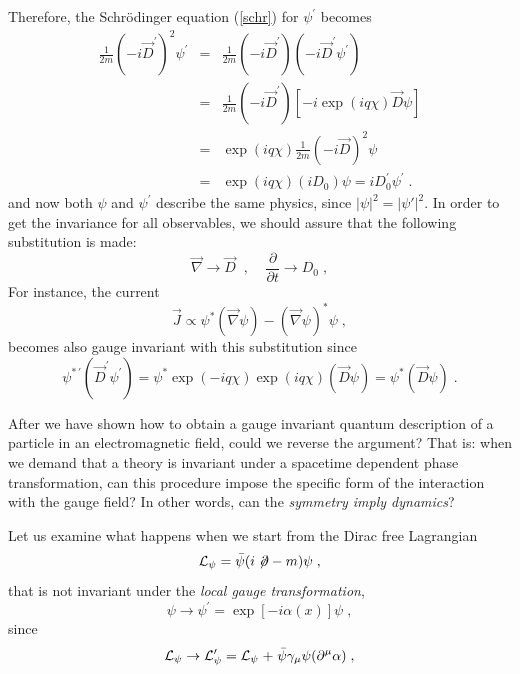 \documentclass[12pt]{report}
\newcommand{\g}{\gamma}
\newcommand{\lag}{{\cal L}}
\newcommand{\del}{\partial}
\newcommand{\dels}{\not \! \partial}
\begin{document}
Therefore, the Schr\"odinger equation (\ref{schr}) for $\psi^\prime$
becomes 
\begin{eqnarray*}
{ \frac{1}{2m} (-i\vec{D}^\prime)^2  \psi^\prime } &=& 
\frac{1}{2m} (-i \vec{D}^\prime) ( -i \vec{D}^\prime \psi^\prime) 
\\
&=&\frac{1}{2m} (-i \vec{D}^\prime) 
\left[ -i \exp\left(i q \chi\right) \vec{D} \psi \right] 
\\
&=& \exp\left(i q \chi\right) { \frac{1}{2m} (-i \vec{D})^2 \psi }
\\
&=& 
\exp\left(i q \chi\right) { ( i D_0 ) \psi} = 
{ i D_0^\prime \psi^\prime} \; .
\end{eqnarray*}
and now both $\psi$ and $\psi^\prime$ describe the same physics,
since $|\psi|^2 = |\psi'|^2$. In order to get the invariance for all
observables, we should assure that the following substitution is made:
\[
\vec{\nabla} \to \vec{D}  \;\;, \;\;\;\; \frac{\del}{\del t} \to D_0
\; ,
\] 
For instance, the current
\[
\vec{J} \propto \psi^* (\vec{\nabla} \psi) - (\vec{\nabla} \psi)^* \psi
\; , 
\]
becomes also gauge invariant with this substitution since
\[
\psi^{* \, \prime} (\vec{D}^\prime \psi^\prime) = 
\psi^* \exp\left(-i q \chi\right) 
\exp\left(i q \chi\right) (\vec{D} \psi) = \psi^* (\vec{D} \psi)
\; .
\]

After we have shown how to obtain a gauge invariant quantum
description of a particle in an electromagnetic field, could we
reverse the argument? That is: when we demand that a theory is
invariant under a spacetime dependent phase transformation, can
this procedure impose the specific form of the interaction with the
gauge field? In other words, can the {\it symmetry imply dynamics}?

Let us examine what happens when we start from the Dirac free Lagrangian
\[
\lag_\psi = \bar{\psi} (i \dels - m) \psi \; , 
\]
that is not invariant under the {\it local gauge transformation}, 
\[
\psi \to \psi^\prime  = \exp\left[-i \alpha(x) \right] \psi \; ,
\]
since
\[
\lag_\psi \to \lag_\psi^\prime = \lag_\psi 
{ \; + \; \bar{\psi} \g_\mu \psi (\del^\mu \alpha)} \; ,
\]
\end{document}
